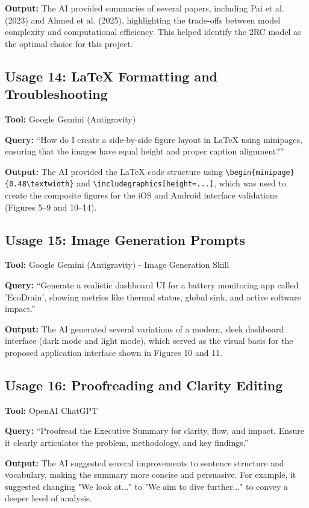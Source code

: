 \documentclass[12pt]{article}
\begin{document}
\textbf{Output:} The AI provided summaries of several papers, including Pai et al. (2023) and Ahmed et al. (2025), highlighting the trade-offs between model complexity and computational efficiency. This helped identify the 2RC model as the optimal choice for this project.

\subsection*{Usage 14: LaTeX Formatting and Troubleshooting}
\textbf{Tool:} Google Gemini (Antigravity)

\textbf{Query:} ``How do I create a side-by-side figure layout in LaTeX using minipages, ensuring that the images have equal height and proper caption alignment?''

\textbf{Output:} The AI provided the LaTeX code structure using \texttt{\textbackslash begin\{minipage\}\{0.48\textbackslash textwidth\}} and \texttt{\textbackslash includegraphics[height=...]}, which was used to create the composite figures for the iOS and Android interface validations (Figures 5--9 and 10--14).

\newpage

\subsection*{Usage 15: Image Generation Prompts}
\textbf{Tool:} Google Gemini (Antigravity) - Image Generation Skill

\textbf{Query:} ``Generate a realistic dashboard UI for a battery monitoring app called 'EcoDrain', showing metrics like thermal status, global sink, and active software impact.''

\textbf{Output:} The AI generated several variations of a modern, sleek dashboard interface (dark mode and light mode), which served as the visual basis for the proposed application interface shown in Figures 10 and 11.

\subsection*{Usage 16: Proofreading and Clarity Editing}
\textbf{Tool:} OpenAI ChatGPT

\textbf{Query:} ``Proofread the Executive Summary for clarity, flow, and impact. Ensure it clearly articulates the problem, methodology, and key findings.''

\textbf{Output:} The AI suggested several improvements to sentence structure and vocabulary, making the summary more concise and persuasive. For example, it suggested changing "We look at..." to "We aim to dive further..." to convey a deeper level of analysis.
\end{document}
